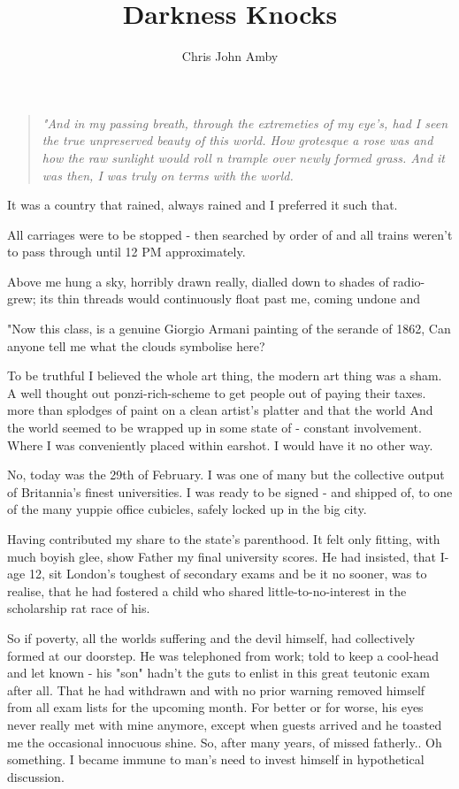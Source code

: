 \documentclass[12pt,openany]{book}
\title{\textbf{Darkness Knocks}}
\author{Chris John Amby}
\begin{document}
\maketitle

\begin{quote}
\textit{"And in my passing breath, through
the extremeties of my eye's, had I seen
the true unpreserved beauty of this world. How
grotesque a rose was and how the raw sunlight
would roll n trample over newly formed grass.
And it was then, I was truly on terms with the world.}\\
\end{quote}
\newpage

It was a country that rained, always rained and I preferred it such that.

All carriages were to be stopped - then searched
by order of and all trains weren't
to pass through until 12 PM approximately.

Above me hung a sky, horribly drawn really,
dialled down to shades of radio-grew; its
thin threads would continuously float past me, coming undone
and

"Now this class, is a genuine Giorgio Armani
painting of the serande of 1862, Can anyone tell
me what the clouds symbolise here?

To be truthful I believed the whole art thing,
the modern art thing was a sham. A well thought out ponzi-rich-scheme
to get people out of paying their taxes.
more than splodges of paint on a clean artist's
platter and that the world
And the world seemed to be wrapped up in some state
of - constant involvement.
Where I was conveniently placed within earshot.
I would have it no other way.

No, today was the 29th of February.
I was one of many but the collective
output of Britannia's finest universities. I was
ready to be signed - and shipped of, to one of the
many yuppie office cubicles, safely
locked up in the big city.

Having contributed my share to the state's
parenthood. It felt only fitting, with
much boyish glee, show Father my final university
scores. He had insisted, that I- age 12,
sit London's toughest of secondary
exams and be it no sooner, was to realise,
that he had fostered a child who shared
little-to-no-interest in the scholarship
rat race of his.

So if poverty, all the worlds suffering
and the devil himself, had collectively
formed at our doorstep. He was telephoned from
work; told to keep a cool-head and let known
- his "son" hadn't the guts to enlist
in this great teutonic exam after all. That he had
withdrawn and with no prior warning
removed himself from all
exam lists for the upcoming month.
For better or for worse, his eyes never really
met with mine anymore, except when guests
arrived and he toasted me the occasional
innocuous shine. So, after many years, of missed
fatherly.. Oh something. I became immune
to man's need to invest himself in hypothetical
discussion.
\end{document}
